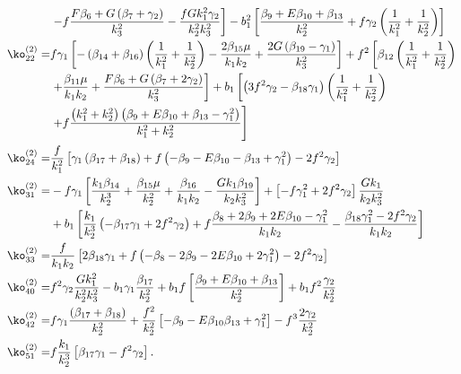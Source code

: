 {\begin{align*}
&\left. - f\frac{F \beta_{6} + G \left(\beta_{7} + \gamma_2 \right)}{k_3^2} - \frac{f G k_1^2 \gamma_2}{k_2^2 k_3^2}\right] - b_1^2 \left[ \frac{\beta_{9} + E \beta_{10} + \beta_{13}}{k_2^2}  + f \gamma_2 \left(\frac{1}{k_1^2}+\frac{1}{k_2^2} \right)\right] \\
\ko_{22}^{(2)}=&  f \gamma_1 \left[ - \left(\beta_{14} + \beta_{16} \right)\left(\frac{1}{k_1^2}+\frac{1}{k_2^2}\right)  - \frac{2 \beta_{15} \mu}{k_1 k_2} + \frac{2 G \left(\beta_{19} - \gamma_1\right)}{k_3^2}\right] + f^2 \left[ \beta_{12}\left(\frac{1}{k_1^2}+\frac{1}{k_2^2} \right) \right. \\
&\left. + \frac{\beta_{11} \mu}{k_1 k_2} + \frac{F \beta_{6} + G \left(\beta_{7} + 2 \gamma_2\right)}{k_3^2}  \right] + b_1 \left[  \left(3 f^2 \gamma_2 -\beta_{18} \gamma_1 \right) \left(\frac{1}{k_1^2}+\frac{1}{k_2^2} \right) \right. \\
&\left. + f \frac{\left(k_1^2 + k_2^2\right) \left(\beta_{9} + E \beta_{10} + \beta_{13} - \gamma_1^2\right)}{k_1^2 + k_2^2}   \right]\\
\ko_{24}^{(2)}=& \frac{f}{k_1^2} \left[ \gamma_1 \left(\beta_{17} + \beta_{18}\right)+ f\left(- \beta_{9} - E \beta_{10} - \beta_{13} + \gamma_1^2\right) - 2 f^2 \gamma_2 \right]\\
\ko_{31}^{(2)}=& - f \gamma_1 \left[ \frac{k_1 \beta_{14}}{k_2^3} + \frac{\beta_{15} \mu}{k_2^2} + \frac{\beta_{16}}{k_1 k_2} - \frac{G k_1 \beta_{19}}{k_2 k_3^2} \right] + \left[- f \gamma_1^2 + 2 f^2 \gamma_2 \right] \frac{G k_1}{k_2 k_3^2} \\
&+ b_1 \left[  \frac{k_1}{k_2^3} \left( -\beta_{17} \gamma_1 + 2 f^2 \gamma_2 \right) + f \frac{\beta_{8}  + 2 \beta_{9} + 2 E \beta_{10} - \gamma_1^2 }{k_1 k_2}  - \frac{\beta_{18} \gamma_1^2 - 2 f^2 \gamma_2}{k_1 k_2} \right] \\
\ko_{33}^{(2)}=&\frac{f}{k_1 k_2} \left[ 2 \beta_{18} \gamma_1 + f \left( - \beta_{8} - 2 \beta_{9} - 2 E \beta_{10} + 2 \gamma_1^2 \right) - 2 f^2 \gamma_2 \right]\\
\ko_{40}^{(2)}=& f^2 \gamma_2 \frac{G k_1^2}{k_2^2 k_3^2} - b_1 \gamma_1 \frac{\beta_{17}}{k_2^2} + b_1 f \left[ \frac{\beta_{9} + E \beta_{10} + \beta_{13}}{k_2^2} \right] + b_1 f^2 \frac{\gamma_2}{k_2^2} \\
\ko_{42}^{(2)}=& f \gamma_1 \frac{\left( \beta_{17} + \beta_{18}\right)}{k_2^2} + \frac{f^2}{k_2^2} \left[ -\beta_{9} - E \beta_{10} \beta_{13} + \gamma_1^2 \right] - f^3 \frac{2 \gamma_2}{k_2^2}\\
\ko_{51}^{(2)}=& f \frac{k_1}{k_2^3} \left[ \beta_{17} \gamma_1 - f^2 \gamma_2  \right]  .
\end{align*}

}
